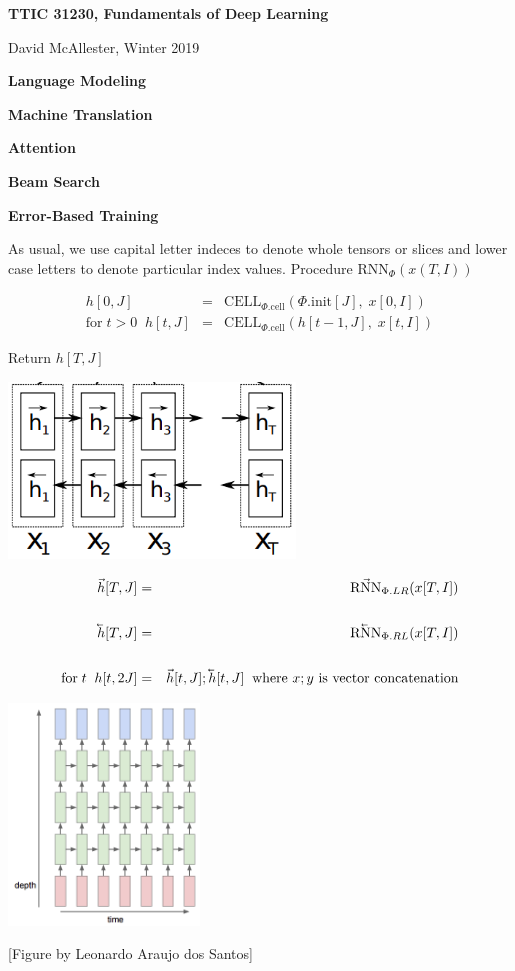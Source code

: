




{\Huge

  \centerline{\bf TTIC 31230, Fundamentals of Deep Learning}
  \bigskip
  \centerline{David McAllester, Winter 2019}
  \vfill
  \centerline{\bf Language Modeling}
  \vfill
  \centerline{\bf Machine Translation}
  \vfill
  \centerline{\bf Attention}
  \vfill
  \centerline{\bf Beam Search}
  \vfill
  \centerline{\bf Error-Based Training}

As usual, we use capital letter indeces to denote whole tensors or slices and lower case letters to denote particular index values.
\vfill
Procedure $\mathrm{RNN}_\Phi(x(T,I))$

\begin{eqnarray*}
h[0,J] &  = &  \mathrm{CELL}_{\Phi.\mathrm{cell}}(\Phi.\mathrm{init}[J],\;x[0,I]) \\
\mathrm{for}\;t>0\;\;h[t,J] &  =  & \mathrm{CELL}_{\Phi.\mathrm{cell}}(h[t-1,J],\;x[t,I])
\end{eqnarray*}

\vfill
Return $h[T,J]$




\centerline{\includegraphics[width = 3in]{../images/biRNN}}

\begin{eqnarray*}
\vec{h}[T,J] & = & \vec{\mathrm{RNN}}_{\Phi.LR}(x[T,I]) \\
\\
\cev{h}[T,J] & = & \cev{\mathrm{RNN}}_{\Phi.RL}(x[T,I]) \\
\\
\mbox{for}\;t\;\;h[t,2J] & = & \vec{h}[t,J];\cev{h}[t,J]\;\;\mbox{where $x;y$ is vector concatenation}
\end{eqnarray*}



\centerline{\includegraphics[width = 2in]{../images/RNNstack}}
\centerline{\large [Figure by Leonardo Araujo dos Santos]}

}

